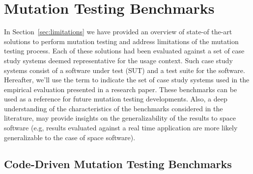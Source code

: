 
\chapter{Mutation Testing Benchmarks}
\label{chapter:industry}

In Section~\ref{sec:limitations} we have provided an overview of state-of the-art solutions to perform mutation testing and address limitations of the mutation testing process.
Each of these solutions had been evaluated against a set of case study systems deemed representative for the usage context. Such case study systems consist of a software under test (SUT) and a test suite for the software.
Hereafter, we'll use the term  to indicate the set of case study systems used in the empirical evaluation presented in a research paper.
These benchmarks can be used as a reference for future mutation testing developments. 
Also, a deep understanding of the characteristics of the benchmarks considered in the literature, may provide insights on the generalizability of the results to space software (e.g, results evaluated against a real time application are more likely generalizable to the case of space software).





\section{Code-Driven Mutation Testing Benchmarks}
\label{section:industry:code}


